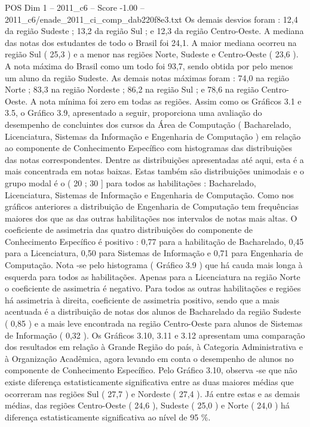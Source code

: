 \begin{textsample}{POS Dim 1 – 2011\_c6 – Score -1.00 – 2011\_c6/enade\_2011\_ci\_comp\_dab220f8e3.txt}
Os demais desvios foram : 12,4 da região Sudeste ; 13,2 da região Sul ; e 12,3 da região Centro-Oeste.
A mediana das notas dos estudantes de todo o Brasil foi 24,1.
A maior mediana ocorreu na região Sul ( 25,3 ) e a menor nas regiões Norte, Sudeste e Centro-Oeste ( 23,6 ).
A nota máxima do Brasil como um todo foi 93,7, sendo obtida por pelo menos um aluno da região Sudeste.
As demais notas máximas foram : 74,0 na região Norte ; 83,3 na região Nordeste ; 86,2 na região Sul ; e 78,6 na região Centro-Oeste.
A nota mínima foi zero em todas as regiões.
Assim como os Gráficos 3.1 e 3.5, o Gráfico 3.9, apresentado a seguir, proporciona uma avaliação do desempenho de concluintes dos cursos da Área de Computação ( Bacharelado, Licenciatura, Sistemas da Informação e Engenharia de Computação ) em relação ao componente de Conhecimento Específico com histogramas das distribuições das notas correspondentes.
Dentre as distribuições apresentadas até aqui, esta é a mais concentrada em notas baixas.
Estas também são distribuições unimodais e o grupo modal é o ( 20 ; 30 ] para todos as habilitações : Bacharelado, Licenciatura, Sistemas de Informação e Engenharia de Computação.
Como nos gráficos anteriores a distribuição de Engenharia de Computação tem frequências maiores dos que as das outras habilitações nos intervalos de notas mais altas.
O coeficiente de assimetria das quatro distribuições do componente de Conhecimento Específico é positivo : 0,77 para a habilitação de Bacharelado, 0,45 para a Licenciatura, 0,50 para Sistemas de Informação e 0,71 para Engenharia de Computação.
Nota -se pelo histograma ( Gráfico 3.9 ) que há cauda mais longa à esquerda para todos as habilitações.
Apenas para a Licenciatura na região Norte o coeficiente de assimetria é negativo.
Para todos as outras habilitações e regiões há assimetria à direita, coeficiente de assimetria positivo, sendo que a mais acentuada é a distribuição de notas dos alunos de Bacharelado da região Sudeste ( 0,85 ) e a mais leve encontrada na região Centro-Oeste para alunos de Sistemas de Informação ( 0,32 ).
Os Gráficos 3.10, 3.11 e 3.12 apresentam uma comparação dos resultados em relação à Grande Região do país, à Categoria Administrativa e à Organização Acadêmica, agora levando em conta o desempenho de alunos no componente de Conhecimento Específico.
Pelo Gráfico 3.10, observa -se que não existe diferença estatisticamente significativa entre as duas maiores médias que ocorreram nas regiões Sul ( 27,7 ) e Nordeste ( 27,4 ).
Já entre estas e as demais médias, das regiões Centro-Oeste ( 24,6 ), Sudeste ( 25,0 ) e Norte ( 24,0 ) há diferença estatisticamente significativa ao nível de 95 \%.

\end{textsample}

